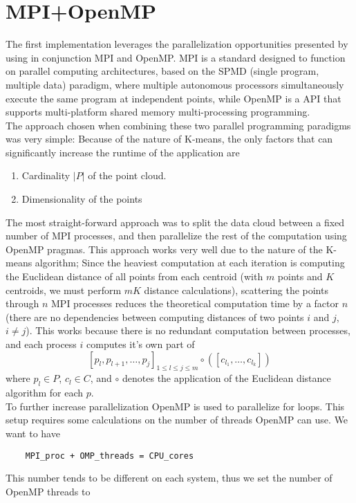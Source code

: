 \documentclass{article}
\begin{document}
\section*{MPI+OpenMP}
The first implementation leverages the parallelization opportunities presented by using in conjunction MPI and OpenMP. MPI is a standard designed to function on parallel computing architectures, based on the SPMD (single program, multiple data) paradigm, where multiple autonomous processors simultaneously execute the same program at independent points, while OpenMP is a API that supports multi-platform shared memory multi-processing programming. \\The approach chosen when combining these two parallel programming paradigms  was very simple: Because of the nature of K-means, the only factors that can significantly increase the runtime of the application are
\begin{enumerate}
    \item Cardinality $|P|$ of the point cloud.
    \item Dimensionality of the points
\end{enumerate}
The most straight-forward approach was to split the data cloud between a fixed number of MPI processes, and then parallelize the rest of the computation using OpenMP pragmas. This approach works very well due to the nature of the K-means algorithm; Since the heaviest computation at each iteration is computing the Euclidean distance of all points from each centroid (with $m$ points and $K$ centroids, we must perform $mK$ distance calculations), scattering the points through $n$ MPI processes reduces the theoretical computation time by a factor $n$ (there are no dependencies between computing distances of two points $i$ and $j$, $i\neq j$). This works because there is no redundant computation between processes, and each process $i$ computes it's own part of $$[p_l, p_{l+1}, \ldots, p_j]_{1\leq l \leq j \leq m} \circ([c_{l_1},\ldots,c_{l_k}])$$
where $p_l\in P$, $c_l \in C$, and $\circ$ denotes the application of the Euclidean distance algorithm for each $p$.\\ To further increase parallelization OpenMP is used to parallelize for loops. This setup requires some calculations on the number of threads OpenMP can use. We want to have 
\begin{lstlisting}
    MPI_proc + OMP_threads = CPU_cores
\end{lstlisting}
This number tends to be different on each system, thus we set the number of OpenMP threads to 
\end{document}
